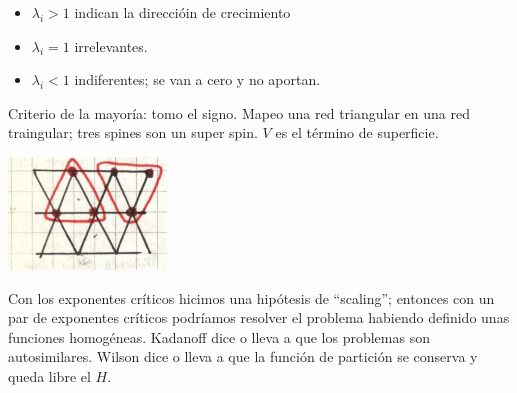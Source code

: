 \documentclass[10pt,oneside]{CBFT_book}
\begin{document}
\begin{itemize}
 \item $\lambda_i > 1 $ indican la direccióin de crecimiento
 \item $\lambda_i = 1 $ irrelevantes.
 \item $\lambda_i < 1 $ indiferentes; se van a cero y no aportan.
\end{itemize}

Criterio de la mayoría: tomo el signo. Mapeo una red triangular en una red traingular; tres spines
son un super spin. $V$ es el término de superficie.

\includegraphics[scale=0.6]{images/1606337128.jpg}

Con los exponentes críticos hicimos una hipótesis de ``scaling''; entonces con un par de exponentes
críticos podríamos resolver el problema habiendo definido unas funciones homogéneas.
Kadanoff dice o lleva a que los problemas son autosimilares. Wilson dice o lleva a que la función
de partición se conserva y queda libre el $H$.




\end{document}
